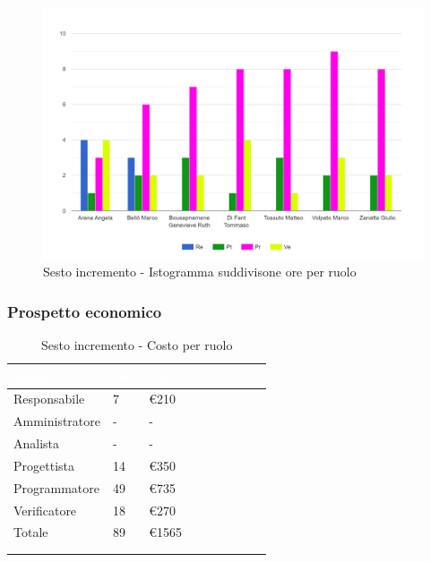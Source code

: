 {{      \begin{figure}[H]
        \includegraphics[width=15cm]{sezioni/images/sesto.png}
        \centering
        \caption{Sesto incremento - Istogramma suddivisone ore per ruolo}
     \end{figure}
    }

    \subsubsection{Prospetto economico}
    {
        \setlength{\freewidth}{\dimexpr\textwidth-30\tabcolsep}
        \renewcommand{\arraystretch}{1.0}
        \setlength{\aboverulesep}{0pt}
        \setlength{\belowrulesep}{0pt}
        \begin{longtable}{C{.4\freewidth} C{.2\freewidth} C{.2\freewidth} C{.2\freewidth} C{.2\freewidth} C{.2\freewidth} C{.2\freewidth} C{.2\freewidth} C{.2\freewidth}}
          \toprule
        \textcolor{white}{\textbf{Ruolo}}&
        \textcolor{white}{\textbf{Ore}}&
        \textcolor{white}{\textbf{Costo}}\\
        \toprule
        \endhead
            
        Responsabile  & 7 & \euro210\\
        Amministratore  & - & - \\
        Analista &- & -\\
        Progettista &14 &\euro350\\
        Programmatore &49 & \euro735\\
        Verificatore &18 &\euro270\\
        Totale&89&\euro1565\\
        \bottomrule
      \\
        \caption{Sesto incremento - Costo per ruolo}


\end{longtable}}}
